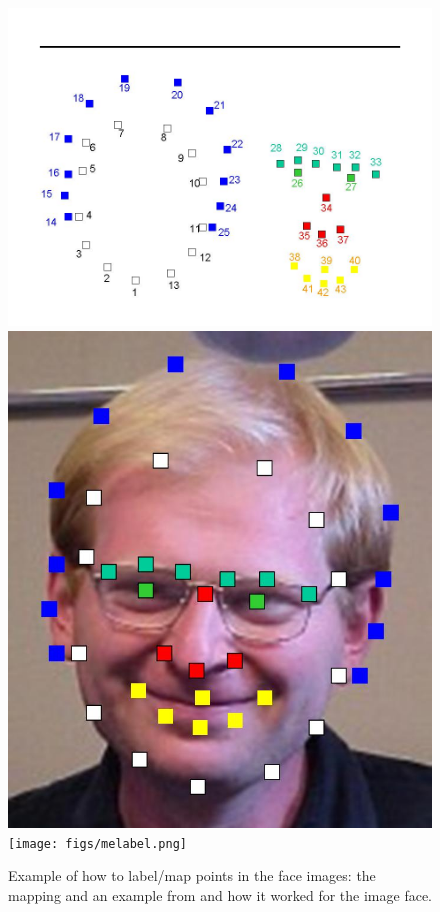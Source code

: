 \documentclass[11pt]{article}
\begin{document}
\begin{figure} [ht]
\begin{center}
\includegraphics[scale=0.3]{figs/pointlabels.jpg}  
\includegraphics[scale=0.3]{figs/efros.jpg}  
\texttt{[image: figs/melabel.png]}  
\caption{Example of how to label/map points in the face images: the mapping and an example from  \cite{tamara} and how it worked for the image face.}
\label{pointslabel}
\end{center}
\end{figure}
\end{document}
